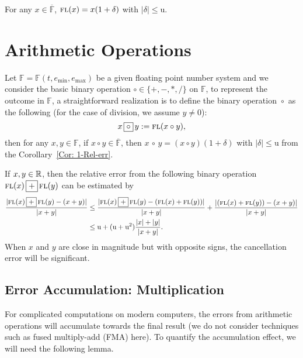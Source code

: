 \begin{corollary}
\label{Cor: 1-Rel-err}
    For any $x\in\overline{\mathbb{F}}$, $\textsc{fl}(x) = x(1+\delta)$ with $|\delta|\le \mathrm{u}$.
\end{corollary}


\setlength\fboxsep{2pt}
\section{Arithmetic Operations}
\label{Sec: 1-Ari-Ope}
Let $\mathbb{F} = \mathbb{F}(t, e_{\min}, e_{\max})$ be a given floating point number system and we consider the basic binary operation $\circ\in \{ +, -, *, /\}$ on $\mathbb{F}$, to represent the outcome in $\mathbb{F}$, a straightforward realization is to define the binary operation $\boxed{\circ}$ as the following (for the case of division, we assume $y\neq 0$):
$$x \,\boxed{\circ}\, y := \textsc{fl}(x\circ y),$$
then for any $x, y\in\mathbb{F}$, if $x\circ y\in \overline{\mathbb{F}}$, then $x \,\boxed{\circ}\, y = (x\circ y)(1 + \delta)$ with $|\delta| \le \mathrm{u}$ from the Corollary~\ref{Cor: 1-Rel-err}.

\begin{remark}
\label{Rem: 1-Can-err}
    If $x, y\in\mathbb R$, then the relative error from the following binary operation $\textsc{fl}(x)\,\boxed{+}\,\textsc{fl}(y)$ can be estimated by
    \begin{equation*}
    \begin{aligned}
    \frac{|\textsc{fl}(x)\,\boxed{+}\,\textsc{fl}(y)- (x +  y) |}{|x + y|} &\le \frac{|\textsc{fl}(x)\,\boxed{+}\,\textsc{fl}(y) - (\textsc{fl}(x) +  \textsc{fl}(y)) |}{|x + y|} + \frac{| (\textsc{fl}(x) +  \textsc{fl}(y)) - (x+y)   |}{|x+y|}\\  
    &\le\mathrm{u} + (\mathrm{u} +\mathrm{u}^2) \frac{|x|+|y|}{|x+y|}.
    \end{aligned}
    \end{equation*}
    When $x$ and $y$ are close in magnitude but with opposite signs, the cancellation error will be significant.
\end{remark}
\subsection{Error Accumulation: Multiplication}
\label{SSec: 1-Err-Acc-Mul}
For complicated computations on modern computers, the errors from arithmetic operations will accumulate towards the final result (we do not consider techniques such as fused multiply-add (FMA) here). To quantify the accumulation effect, we will need the following lemma.

